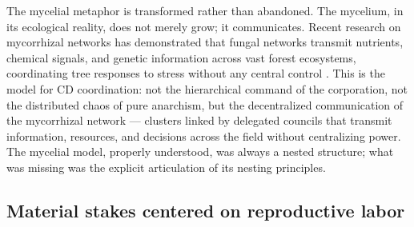 The mycelial metaphor is transformed rather than abandoned. The mycelium, in its ecological reality, does not merely grow; it communicates. Recent research on mycorrhizal networks has demonstrated that fungal networks transmit nutrients, chemical signals, and genetic information across vast forest ecosystems, coordinating tree responses to stress without any central control \cite{simard_2016}. This is the model for CD coordination: not the hierarchical command of the corporation, not the distributed chaos of pure anarchism, but the decentralized communication of the mycorrhizal network — clusters linked by delegated councils that transmit information, resources, and decisions across the field without centralizing power. The mycelial model, properly understood, was always a nested structure; what was missing was the explicit articulation of its nesting principles.

\subsection{Material stakes centered on reproductive labor}

